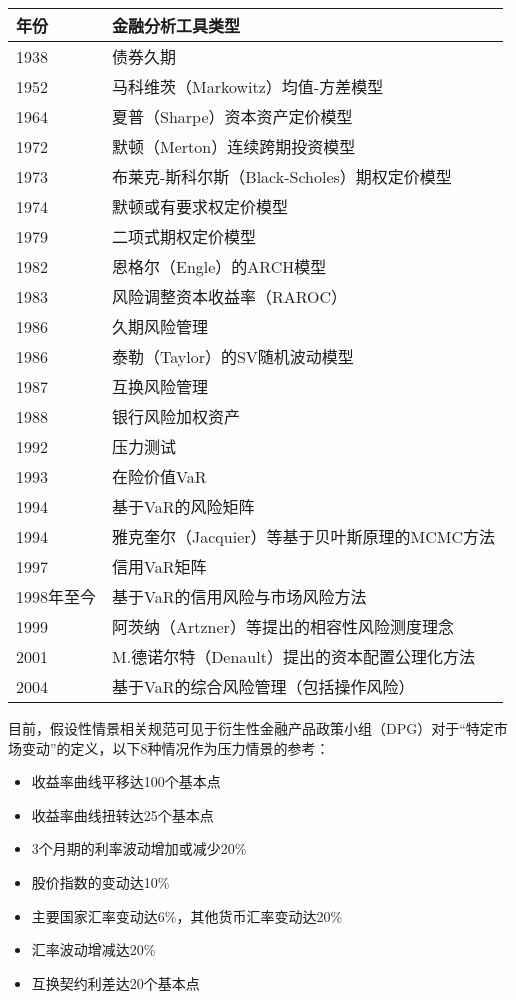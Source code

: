 \documentclass[UTF8]{ctexart}
\begin{document}
\begin{tabular}{|l|l|}
\hline
年份  & 金融分析工具类型\\
\hline
1938  & 债券久期\\
1952 & 马科维茨（Markowitz）均值-方差模型\\
1964 & 夏普（Sharpe）资本资产定价模型\\
1972 & 默顿（Merton）连续跨期投资模型\\
1973 & 布莱克-斯科尔斯（Black-Scholes）期权定价模型\\
1974 & 默顿或有要求权定价模型\\
1979 & 二项式期权定价模型\\
1982 & 恩格尔（Engle）的ARCH模型\\
1983 & 风险调整资本收益率（RAROC）\\
1986 & 久期风险管理\\
1986 & 泰勒（Taylor）的SV随机波动模型\\
1987 & 互换风险管理\\
1988 & 银行风险加权资产\\
1992 & 压力测试\\
1993 & 在险价值VaR\\
1994 & 基于VaR的风险矩阵\\
1994 & 雅克奎尔（Jacquier）等基于贝叶斯原理的MCMC方法\\
1997 & 信用VaR矩阵\\
1998年至今 & 基于VaR的信用风险与市场风险方法\\
1999 & 阿茨纳（Artzner）等提出的相容性风险测度理念\\
2001 & M.德诺尔特（Denault）提出的资本配置公理化方法\\
2004 & 基于VaR的综合风险管理（包括操作风险）\\
\hline
\end{tabular}

目前，假设性情景相关规范可见于衍生性金融产品政策小组（DPG）对于“特定市场变动”的定义，以下8种情况作为压力情景的参考：
\begin{itemize}
\item 收益率曲线平移达100个基本点
\item 收益率曲线扭转达25个基本点
\item 3个月期的利率波动增加或减少20\%
\item 股价指数的变动达10\%
\item 主要国家汇率变动达6\%，其他货币汇率变动达20\%
\item 汇率波动增减达20\%
\item 互换契约利差达20个基本点
\end{itemize}
\end{document}
